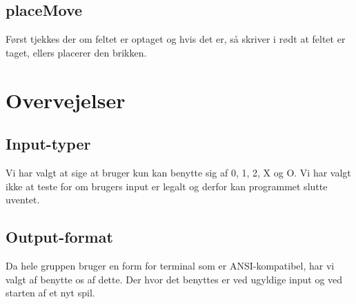 \documentclass[a4paper,12pt]{article}
\begin{document}
\subsection*{placeMove}
Først tjekkes der om feltet er optaget og hvis det er, så skriver i rødt at feltet er taget, ellers placerer den brikken.


\section*{Overvejelser}
\subsection*{Input-typer}
Vi har valgt at sige at bruger kun kan benytte sig af 0, 1, 2, X og O. Vi har valgt ikke
at teste for om brugers input er legalt og derfor kan programmet slutte uventet.

\subsection*{Output-format}
Da hele gruppen bruger en form for terminal som er ANSI-kompatibel, har vi
valgt af benytte os af dette. Der hvor det benyttes er ved ugyldige input og ved
starten af et nyt spil.
\end{document}
